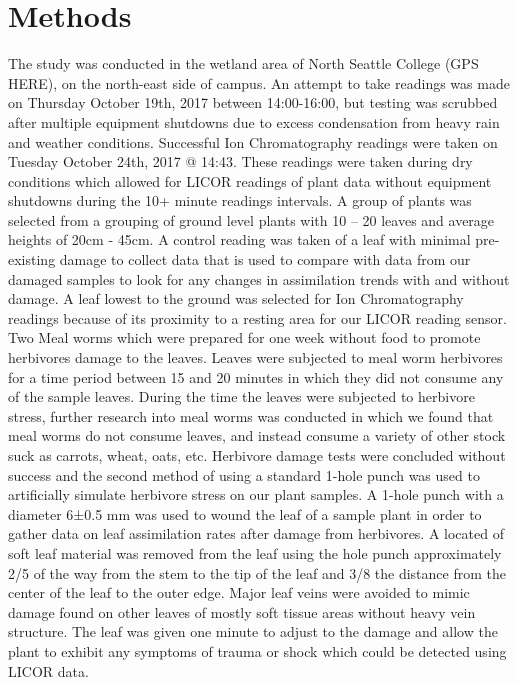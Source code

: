 \documentclass[twoside,twocolumn]{article}
\begin{document}

\section{Methods}

The study was conducted in the wetland area of North Seattle College (GPS HERE), on the north-east side of campus.  An attempt to take readings was made on Thursday October 19th, 2017 between 14:00-16:00, but testing was scrubbed after multiple equipment shutdowns due to excess condensation from heavy rain and weather conditions. Successful Ion Chromatography readings were taken on Tuesday October 24th, 2017 @ 14:43. These readings were taken during dry conditions which allowed for LICOR readings of plant data without equipment shutdowns during the 10+ minute readings intervals.
A group of plants was selected from a grouping of ground level plants with 10 – 20 leaves and average heights of 20cm - 45cm. A control reading was taken of a leaf with minimal pre-existing damage to collect data that is used to compare with data from our damaged samples to look for any changes in assimilation trends with and without damage. A leaf lowest to the ground was selected for Ion Chromatography readings because of its proximity to a resting area for our LICOR reading sensor.
Two Meal worms which were prepared for one week without food to promote herbivores damage to the leaves. Leaves were subjected to meal worm herbivores for a time period between 15 and 20 minutes in which they did not consume any of the sample leaves. During the time the leaves were subjected to herbivore stress, further research into meal worms was conducted in which we found that meal worms do not consume leaves, and instead consume a variety of other stock suck as carrots, wheat, oats, etc. Herbivore damage tests were concluded without success and the second method of using a standard 1-hole punch was used to artificially simulate herbivore stress on our plant samples.
A 1-hole punch with a diameter 6±0.5 mm was used to wound the leaf of a sample plant in order to gather data on leaf assimilation rates after damage from herbivores. A located of soft leaf material was removed from the leaf using the hole punch approximately 2/5 of the way from the stem to the tip of the leaf and 3/8 the distance from the center of the leaf to the outer edge. Major leaf veins were avoided to mimic damage found on other leaves of mostly soft tissue areas without heavy vein structure. The leaf was given one minute to adjust to the damage and allow the plant to exhibit any symptoms of trauma or shock which could be detected using LICOR data. 
\end{document}

